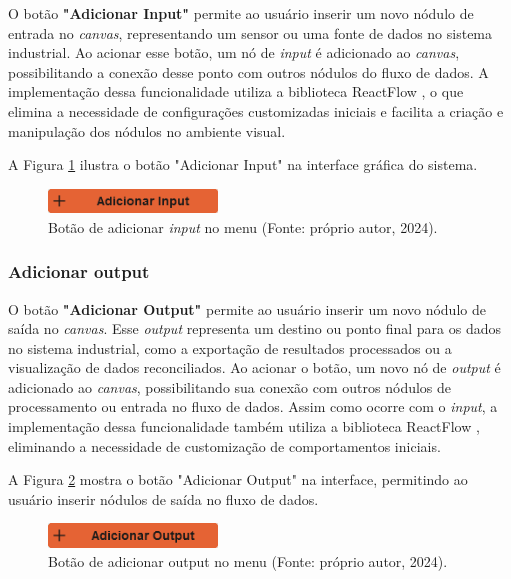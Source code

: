 O botão \textbf{"Adicionar Input"} permite ao usuário inserir um novo nódulo de entrada no \textit{canvas}, representando um sensor ou uma fonte de dados no sistema industrial. Ao acionar esse botão, um nó de \textit{input} é adicionado ao \textit{canvas}, possibilitando a conexão desse ponto com outros nódulos do fluxo de dados. A implementação dessa funcionalidade utiliza a biblioteca ReactFlow \cite{reactflow}, o que elimina a necessidade de configurações customizadas iniciais e facilita a criação e manipulação dos nódulos no ambiente visual.

A Figura \ref{Fig:AddInputButton} ilustra o botão "Adicionar Input" na interface gráfica do sistema.

\begin{figure}[htbp]
    \centering
    \includegraphics[width=0.4\textwidth]{figuras/add-input-button.png}
    \caption{Botão de adicionar \textit{input} no menu (Fonte: próprio autor, 2024).}
    \label{Fig:AddInputButton}
\end{figure}

\subsubsection{Adicionar output}

O botão \textbf{"Adicionar Output"} permite ao usuário inserir um novo nódulo de saída no \textit{canvas}. Esse \textit{output} representa um destino ou ponto final para os dados no sistema industrial, como a exportação de resultados processados ou a visualização de dados reconciliados. Ao acionar o botão, um novo nó de \textit{output} é adicionado ao \textit{canvas}, possibilitando sua conexão com outros nódulos de processamento ou entrada no fluxo de dados. Assim como ocorre com o \textit{input}, a implementação dessa funcionalidade também utiliza a biblioteca ReactFlow \cite{reactflow}, eliminando a necessidade de customização de comportamentos iniciais.

A Figura \ref{Fig:AddOutputButton} mostra o botão "Adicionar Output" na interface, permitindo ao usuário inserir nódulos de saída no fluxo de dados.

\begin{figure}[htbp]
    \centering
    \includegraphics[width=0.4\textwidth]{figuras/add-output-button.png}
    \caption{Botão de adicionar output no menu (Fonte: próprio autor, 2024).}
    \label{Fig:AddOutputButton}
\end{figure}

